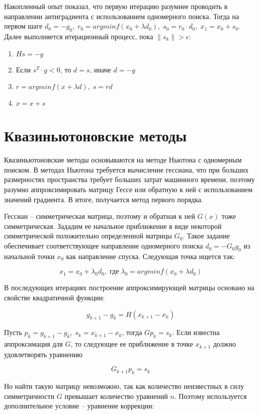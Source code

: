 \documentclass[12pt]{article}
\begin{document}
Накопленный опыт показал, что первую итерацию разумнее проводить в направлении антиградиента с использованием одномерного поиска. Тогда на первом шаге $d_0 = -g_0, \; r_0 = arg min f(x_0+\lambda d_0), \; s_0 = r_0 \cdot d_0, \; x_1 = x_0 + s_0$. Далее выполняется итерационный процесс, пока $\lVert s_k \rVert > \epsilon$:

\begin{enumerate}
 	\item $Hs = -g$
 	\item Если $s^T \cdot g < 0$, то $d = s$, иначе $d = -g$
 	\item $r = arg min f(x+\lambda d), \; s = rd$
 	\item $x = x + s$
\end{enumerate}

\newpage
\section{Квазиньютоновские методы}

Квазиньютоновские методы основываются на методе Ньютона с одномерным поиском. В методах Ньютона требуется вычисление гессиана, что при больших размерностях пространства требует больших затрат машинного времени, поэтому разумно аппроксимировать матрицу Гессе или обратную к ней с использованием значений градиента. В итоге, получается метод первого порядка.

Гессиан -- симметрическая матрица, поэтому и обратная к ней $G(x)$ тоже симметрическая. Зададим ее начальное приближение в виде некоторой симметрической положительно определенной матрицы $G_0$. Такое задание обеспечивает соответствующее направление одномерного поиска $d_0=-G_0g_0$ из начальной точки $x_0$ как направление спуска. Следующая точка ищется так:

\[ x_1 = x_0+\lambda_0 d_0, \; \text{где} \; \lambda_0=arg min f(x_0+\lambda d_0) \]

В последующих итерациях построение аппроксимирующей матрицы основано на свойстве квадратичной функции:

\[ g_{k+1}-g_k = H(x_{k+1}-x_k) \]

Пусть $p_k=g_{k+1}-g_k, \; s_k = x_{k+1}-x_k$, тогда $Gp_k=s_k$. Если известна аппроксимация для $G$, то следующее ее приближение в точке $x_{k+1}$ должно удовлетворять уравнению 

\[ G_{k+1}p_k = s_k \]

Но найти такую матрицу невозможно, так как количество неизвестных в силу симметричности $G$ превышает количество уравнений $n$. Поэтому используется дополнительное условие -- уравнение коррекции:
\end{document}
